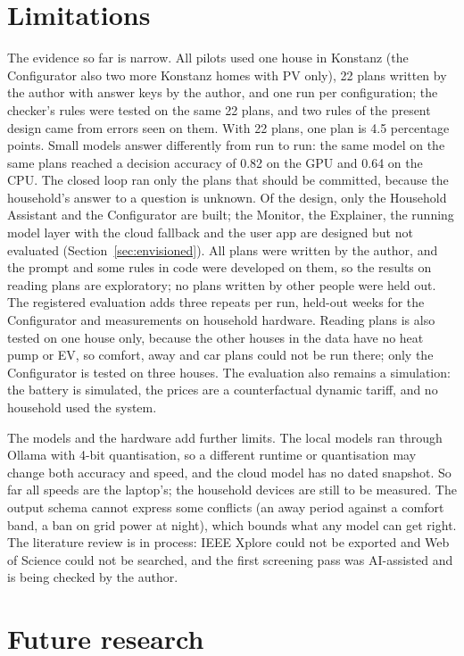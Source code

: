 \section{Limitations}
\label{sec:limitations}

The evidence so far is narrow. All pilots used one house in Konstanz
(the Configurator also two more Konstanz homes with PV only),
22 plans written by the author with answer keys by the author, and one
run per configuration; the checker's rules were tested on the same 22
plans, and two rules of the present design came from errors seen on
them. With 22 plans, one plan is 4.5 percentage points. Small models
answer differently from run to run: the same model on the same plans
reached a decision accuracy of 0.82 on the GPU and 0.64 on the CPU. The
closed loop ran only the plans that should be committed, because the
household's answer to a question is unknown. Of the design, only the
Household Assistant and the Configurator are built; the Monitor, the
Explainer, the running model layer with the cloud fallback and the user
app are designed but not evaluated (Section~\ref{sec:envisioned}).
All plans were written by the author, and the prompt and some rules in
code were developed on them, so the results on reading plans are
exploratory; no plans written by other people were held out. The
registered evaluation adds three repeats per run, held-out weeks for
the Configurator and measurements on household hardware. Reading plans
is also tested on one house only, because the other houses in the data have
no heat pump or EV, so comfort, away and car plans could not be run
there; only the Configurator is tested on three houses. The evaluation
also remains a simulation: the battery is simulated, the prices are a counterfactual
dynamic tariff, and no household used the system.

The models and the hardware add further limits. The local models ran
through Ollama with 4-bit quantisation, so a different runtime or
quantisation may change both accuracy and speed, and the cloud model
has no dated snapshot. So far all speeds are the laptop's; the
household devices are still to be measured. The output schema cannot
express some conflicts (an away period against a comfort band, a ban on
grid power at night), which bounds what any model can get right. The
literature review is in process: IEEE Xplore could not be exported and
Web of Science could not be searched, and the first screening pass was
AI-assisted and is being checked by the author.

\section{Future research}
\label{sec:future}

